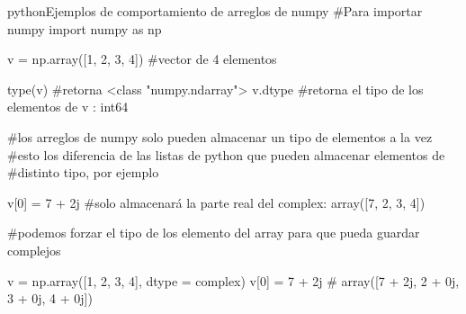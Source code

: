   \begin{sourcecode}[\label{sc:arrayex}]{python}{Ejemplos de comportamiento de arreglos de numpy}
    #Para importar numpy
    import numpy as np

    v = np.array([1, 2, 3, 4]) #vector de 4 elementos

    type(v) #retorna <class "numpy.ndarray">
    v.dtype #retorna el tipo de los elementos de v  : int64

    #los arreglos de numpy solo pueden almacenar un tipo de elementos a la vez
    #esto los diferencia de las listas de python que pueden almacenar elementos de
    #distinto tipo, por ejemplo

    v[0] = 7 + 2j #solo almacenará la parte real del complex:  array([7, 2, 3, 4])

    #podemos forzar el tipo de los elemento del array para que pueda guardar complejos

    v = np.array([1, 2, 3, 4], dtype = complex)
    v[0] = 7 + 2j # array([7 + 2j, 2 + 0j, 3 + 0j, 4 + 0j])
  \end{sourcecode}
    
